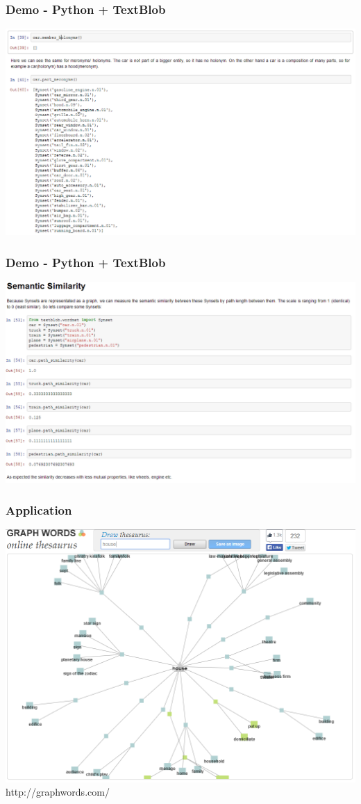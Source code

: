\begin{frame}
\frametitle{Demo - Python + TextBlob}
\includegraphics[scale=0.29]{img/wordnet_ip3.PNG}\\
\end{frame}

\begin{frame}
\frametitle{Demo - Python + TextBlob}
\includegraphics[scale=0.29]{img/wordnet_ip4.PNG}\\
\end{frame}

\begin{frame}
\frametitle{Application}
\includegraphics[scale=0.29]{img/wordnet_app.png}\\
http://graphwords.com/
\end{frame}

